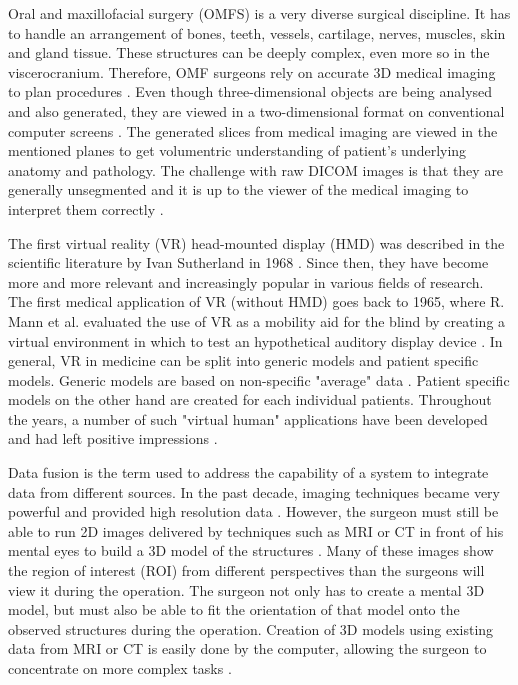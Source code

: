 Oral and maxillofacial surgery (OMFS) is a very diverse surgical discipline.
It has to handle an arrangement of bones, teeth, vessels, cartilage, nerves, muscles, skin and gland tissue.
These structures can be deeply complex, even more so in the viscerocranium.
Therefore, OMF surgeons rely on accurate 3D medical imaging to plan procedures \cite{Fonseca.2018}.
Even though three-dimensional objects are being analysed and also generated, they are viewed in a two-dimensional format on conventional computer screens \cite{brewster1984interactive}.
The generated slices from medical imaging are viewed in the mentioned planes to get volumentric understanding of patient's underlying anatomy and pathology.
The challenge with raw DICOM images is that they are generally unsegmented and it is up to the viewer of the medical imaging to interpret them correctly \cite{Handels.2009}.

The first virtual reality (VR) head-mounted display (HMD) was described in the scientific literature by Ivan Sutherland in 1968 \cite{sutherland1968head}.
Since then, they have become more and more relevant and increasingly popular in various fields of research.
\\
The first medical application of VR (without HMD) goes back to 1965, where R. Mann et al. evaluated the use of VR as a mobility aid for the blind 
by creating a virtual environment in which to test an hypothetical auditory display device \cite{mann1965evaluation}.
In general, VR in medicine can be split into generic models and patient specific models.
Generic models are based on non-specific "average" data \cite{486713}.
Patient specific models on the other hand are created for each individual patients.
Throughout the years, a number of such "virtual human" applications have been developed and had left positive impressions \cite{486713}.

Data fusion is the term used to address the capability of a system to integrate data from different sources.
In the past decade, imaging techniques became very powerful and provided high resolution data \cite{RN2}.
However, the surgeon must still be able to run 2D images delivered by techniques such as MRI or CT in front of his mental eyes to build a 3D model of the structures \cite{Fonseca.2018}.
Many of these images show the region of interest (ROI) from different perspectives than the surgeons will view it during the operation.
The surgeon not only has to create a mental 3D model, but must also be able to fit the orientation of that model onto the observed structures during the operation.
Creation of 3D models using existing data from MRI or CT is easily done by the computer, allowing the surgeon to concentrate on more complex tasks \cite{486713}.

